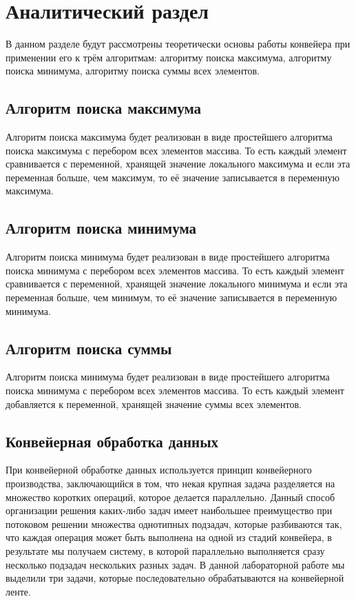 \chapter{Аналитический раздел}
В данном разделе будут рассмотрены теоретически основы работы конвейера при применении его к трём алгоритмам: алгоритму поиска максимума, алгоритму поиска минимума, алгоритму поиска суммы всех элементов.

\section{Алгоритм поиска максимума}
Алгоритм поиска максимума будет реализован в виде простейшего алгоритма поиска максимума с перебором всех элементов массива. То есть каждый элемент сравнивается с переменной, хранящей значение локального максимума и если эта переменная больше, чем максимум, то её значение записывается в переменную максимума.

\section{Алгоритм поиска минимума}
Алгоритм поиска минимума будет реализован в виде простейшего алгоритма поиска минимума с перебором всех элементов массива. То есть каждый элемент сравнивается с переменной, хранящей значение локального минимума и если эта переменная больше, чем минимум, то её значение записывается в переменную минимума.

\section{Алгоритм поиска суммы}
Алгоритм поиска минимума будет реализован в виде простейшего алгоритма поиска минимума с перебором всех элементов массива. То есть каждый элемент добавляется к переменной, хранящей значение суммы всех элементов.

\section{Конвейерная обработка данных}
При конвейерной обработке данных используется принцип конвейерного производства, заключающийся в том, что некая крупная задача разделяется на множество коротких операций, которое делается параллельно. Данный способ организации решения каких-либо задач имеет наибольшее преимущество при потоковом решении множества однотипных подзадач, которые разбиваются так, что каждая операция может быть выполнена на одной из стадий конвейера, в результате мы получаем систему, в которой параллельно выполняется сразу несколько подзадач нескольких разных задач. В данной лабораторной работе мы выделили три задачи, которые последовательно обрабатываются на конвейерной ленте.

